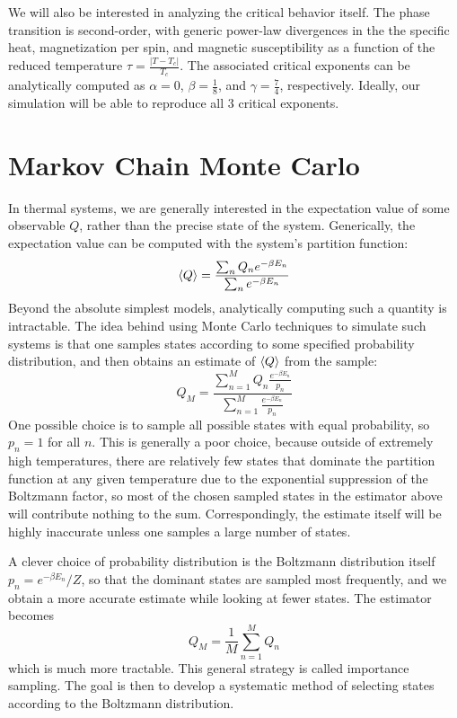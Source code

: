 \documentclass[twocolumn,aps,prl]{revtex4-1} %
\begin{document}
We will also be interested in analyzing the critical behavior itself. The phase transition is second-order, with generic power-law divergences in the the specific heat, magnetization per spin, and magnetic susceptibility as a function of the reduced temperature $\tau = \frac{|T-T_c|}{T_c}$. The associated critical exponents can be analytically computed as $\alpha = 0$, $\beta = \frac{1}{8}$, and $\gamma = \frac{7}{4}$, respectively. Ideally, our simulation will be able to reproduce all 3 critical exponents.

\section{Markov Chain Monte Carlo}
In thermal systems, we are generally interested in the expectation value of some observable $Q$, rather than the precise state of the system. Generically, the expectation value can be computed with the system's partition function:
\begin{equation}
	\braket{Q} = \frac{\sum_{n}Q_ne^{-\beta E_n}}{\sum_{n}e^{-\beta E_n}}
\end{equation}
Beyond the absolute simplest models, analytically computing such a quantity is intractable. The idea behind using Monte Carlo techniques to simulate such systems is that one samples states according to some specified probability distribution, and then obtains an estimate of $\braket{Q}$ from the sample:
\begin{equation}
	Q_M = \frac{\sum^M_{n=1}Q_n\frac{e^{-\beta E_n}}{p_n}}{\sum^M_{n=1}\frac{e^{-\beta E_n}}{p_n}}
\end{equation}
One possible choice is to sample all possible states with equal probability, so $p_n = 1$ for all $n$. This is generally a poor choice, because outside of extremely high temperatures, there are relatively few states that dominate the partition function at any given temperature due to the exponential suppression of the Boltzmann factor, so most of the chosen sampled states in the estimator above will contribute nothing to the sum. Correspondingly, the estimate itself will be highly inaccurate unless one samples a large number of states.

A clever choice of probability distribution is the Boltzmann distribution itself $p_n = e^{-\beta E_n}/Z$, so that the dominant states are sampled most frequently, and we obtain a more accurate estimate while looking at fewer states. The estimator becomes
\begin{equation}
	Q_M = \frac{1}{M}\sum_{n=1}^MQ_n
\end{equation}
which is much more tractable. This general strategy is called importance sampling. The goal is then to develop a systematic method of selecting states according to the Boltzmann distribution.
\end{document}

